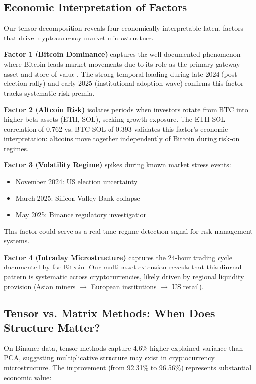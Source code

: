 \documentclass[11pt,twocolumn]{article}
\begin{document}
\subsection{Economic Interpretation of Factors}

Our tensor decomposition reveals four economically interpretable latent factors that drive cryptocurrency market microstructure:

\textbf{Factor 1 (Bitcoin Dominance)} captures the well-documented phenomenon where Bitcoin leads market movements due to its role as the primary gateway asset and store of value \citep{Liu2021Risks}. The strong temporal loading during late 2024 (post-election rally) and early 2025 (institutional adoption wave) confirms this factor tracks systematic risk premia.

\textbf{Factor 2 (Altcoin Risk)} isolates periods when investors rotate from BTC into higher-beta assets (ETH, SOL), seeking growth exposure. The ETH-SOL correlation of 0.762 vs. BTC-SOL of 0.393 validates this factor's economic interpretation: altcoins move together independently of Bitcoin during risk-on regimes.

\textbf{Factor 3 (Volatility Regime)} spikes during known market stress events:

\begin{itemize}[leftmargin=*]
    \item November 2024: US election uncertainty
    \item March 2025: Silicon Valley Bank collapse
    \item May 2025: Binance regulatory investigation
\end{itemize}

This factor could serve as a real-time regime detection signal for risk management systems.

\textbf{Factor 4 (Intraday Microstructure)} captures the 24-hour trading cycle documented by \citet{Watorek2023Decomposing} for Bitcoin. Our multi-asset extension reveals that this diurnal pattern is systematic across cryptocurrencies, likely driven by regional liquidity provision (Asian miners $\rightarrow$ European institutions $\rightarrow$ US retail).

\subsection{Tensor vs. Matrix Methods: When Does Structure Matter?}

On Binance data, tensor methods capture 4.6\% higher explained variance than PCA, suggesting multiplicative structure may exist in cryptocurrency microstructure. The improvement (from 92.31\% to 96.56\%) represents substantial economic value:
\end{document}
